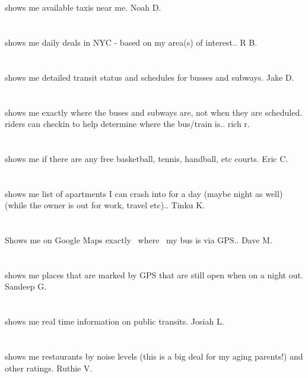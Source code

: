 \section{}shows me available taxis near me. Noah D.
\section{}shows me daily deals in NYC - based on my area(s) of interest.. R B.
\section{}shows me detailed transit status and schedules for busses and subways. Jake D.
\section{}shows me exactly where the buses and subways are,  not when they are scheduled. riders can checkin to help determine where the bus/train is.. rich r.
\section{} shows me if there are any free basketball,  tennis,  handball,  etc courts. Eric C.
\section{}shows me list of apartments I can crash into for a day (maybe night as well) (while the owner is out for work,  travel etc).. Tinku K.
\section{}Shows me on Google Maps exactly ~where~ my bus is via GPS.. Dave M.
\section{}shows me places that are marked by GPS that are still open when on a night out. Sandeep G.
\section{}shows me real time information on public transits. Josiah L.
\section{}shows me restaurants by noise levels (this is a big deal for my aging parents!) and other ratings. Ruthie V.
